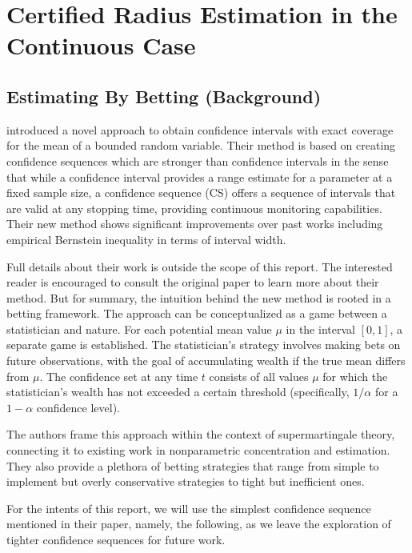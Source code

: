 \section{Certified Radius Estimation in the Continuous Case}\label{sec:continuous}

\subsection{Estimating By Betting (Background)}\label{subsec:estimating-by-betting}
\cite{smith2022estimating} introduced a novel approach to obtain confidence intervals with exact coverage for the mean of a bounded random variable.
Their method is based on creating confidence sequences which are stronger than confidence intervals in the sense that while a confidence interval provides a range estimate for a parameter at a fixed sample size, a confidence sequence (CS) offers a sequence of intervals that are valid at any stopping time, providing continuous monitoring capabilities.
Their new method shows significant improvements over past works including empirical Bernstein inequality in terms of interval width.

Full details about their work is outside the scope of this report.
The interested reader is encouraged to consult the original paper to learn more about their method.
But for summary, the intuition behind the new method is rooted in a betting framework.
The approach can be conceptualized as a game between a statistician and nature.
For each potential mean value $\mu$ in the interval $[0,1]$, a separate game is established.
The statistician's strategy involves making bets on future observations, with the goal of accumulating wealth if the true mean differs from $\mu$.
The confidence set at any time $t$ consists of all values $\mu$ for which the statistician's wealth has not exceeded a certain threshold (specifically, $1/\alpha$ for a $1-\alpha$ confidence level).

The authors frame this approach within the context of supermartingale theory, connecting it to existing work in nonparametric concentration and estimation.
They also provide a plethora of betting strategies that range from simple to implement but overly conservative strategies to tight but inefficient ones.

For the intents of this report, we will use the simplest confidence sequence mentioned in their paper, namely, the following, as we leave the exploration of tighter confidence sequences for future work.

